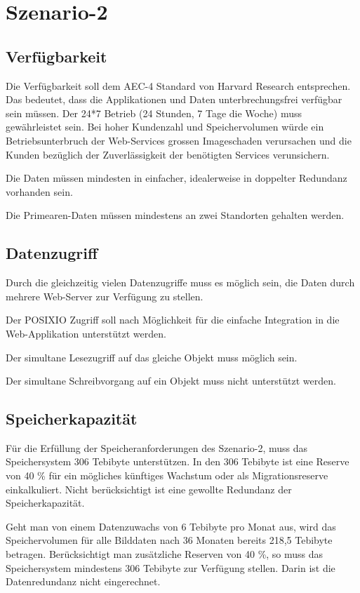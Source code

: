 \section{Szenario-2}\label{Szenario-2}

\subsection{Verfügbarkeit}
Die Verfügbarkeit soll dem AEC-4 Standard von Harvard Research entsprechen. Das bedeutet, dass die Applikationen und Daten unterbrechungsfrei verfügbar sein müssen. Der 24*7 Betrieb (24 Stunden, 7 Tage die Woche) muss gewährleistet sein. Bei hoher Kundenzahl und Speichervolumen würde ein Betriebsunterbruch der Web-Services grossen Imageschaden verursachen und die Kunden bezüglich der Zuverlässigkeit der benötigten Services verunsichern.

Die Daten müssen mindesten in einfacher, idealerweise in doppelter Redundanz vorhanden sein. 

Die \gls{Primearen-Daten} müssen mindestens an zwei Standorten gehalten werden.

\subsection{Datenzugriff}
Durch die gleichzeitig vielen Datenzugriffe muss es möglich sein, die Daten durch mehrere Web-Server zur Verfügung zu stellen.

Der \gls{POSIXIO} Zugriff soll nach Möglichkeit für die einfache Integration in die Web-Applikation unterstützt werden.

Der simultane Lesezugriff auf das gleiche Objekt muss möglich sein.

Der simultane Schreibvorgang auf ein Objekt muss nicht unterstützt werden.

\subsection{Speicherkapazität}
Für die Erfüllung der Speicheranforderungen des Szenario-2, muss das Speichersystem 306 Tebibyte unterstützen. In den 306 Tebibyte ist eine Reserve von 40 \% für ein mögliches künftiges Wachstum oder als Migrationsreserve einkalkuliert. Nicht berücksichtigt ist eine gewollte Redundanz der Speicherkapazität.

Geht man von einem Datenzuwachs von 6 Tebibyte pro Monat aus, wird das Speichervolumen für alle Bilddaten nach 36 Monaten bereits 218,5 Tebibyte betragen. Berücksichtigt man zusätzliche Reserven von 40 \%, so muss das Speichersystem mindestens 306 Tebibyte zur Verfügung stellen. Darin ist die Datenredundanz nicht eingerechnet.

